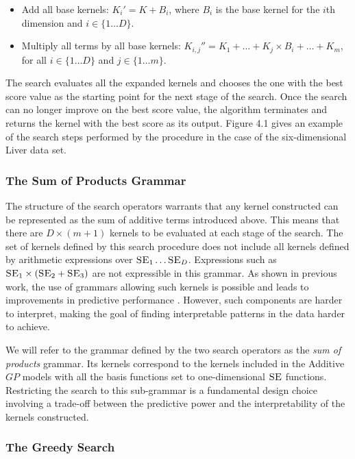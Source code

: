 \documentclass[a4paper,12pt ]{report}
\renewcommand{\GP}{{GP}}
\begin{document}
\begin{itemize}

\item Add all base kernels: $K_{i}' = K + {B_i}$, where $B_i$ is the base {\SE} kernel for the $i$th dimension and $i \in \{1 \ldots D\}$.
\item Multiply all terms by all base kernels: $K_{i, j}'' = K_1 + \ldots + K_j \times B_i + \ldots + K_m$, for all $i \in \{1 \ldots D\}$ and $j \in \{1 \ldots m\}$.

\end{itemize}

The search evaluates all the expanded kernels and chooses the one with the best score value as the starting point for the next stage of the search. Once the search can no longer improve on the best score value, the algorithm terminates and returns the kernel with the best score as its output. Figure 4.1 gives an example of the search steps performed by the procedure in the case of the six-dimensional Liver data set.

\subsubsection*{The Sum of Products Grammar}

The structure of the search operators warrants that any kernel constructed can be represented as the sum of additive terms introduced above. This means that there are $D \times (m + 1) $ kernels to be evaluated at each stage of the search. The set of kernels defined by this search procedure does not include all kernels defined by arithmetic expressions over $\textsc{SE}_1 \ldots \textsc{SE}_D$. Expressions such as $\textsc{SE}_1 \times (\textsc{SE}_2 + \textsc{SE}_3) $ are not expressible in this grammar. As shown in previous work, the use of grammars allowing such kernels is possible and leads to improvements in predictive performance \cite{lloyd14}. However, such components are harder to interpret, making the goal of finding interpretable patterns in the data harder to achieve.

We will refer to the grammar defined by the two search operators as the \emph{sum of products} grammar. Its kernels correspond to the kernels included in the Additive {$\GP$} models with all the basis functions set to one-dimensional {$\textsc{SE}$} functions. Restricting the search to this sub-grammar is a fundamental design choice involving a trade-off between the predictive power and the interpretability of the kernels constructed.


\subsubsection*{The Greedy Search}
\end{document}
